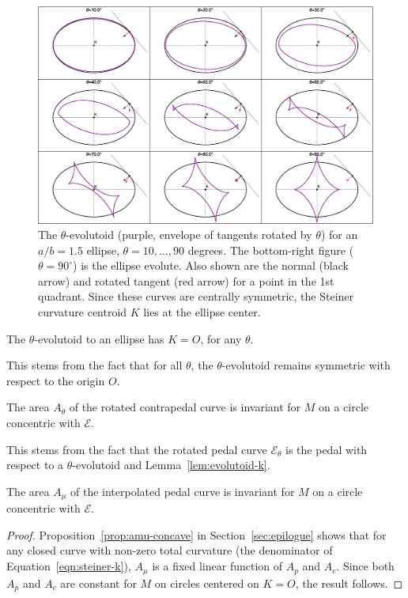 \begin{figure}
    \centering
    \includegraphics[width=\textwidth]{pics/0015_evolutoids.eps}
    \caption{The $\theta$-evolutoid \cite{jesus2015,jesus2014} (purple, envelope of tangents rotated by $\theta$) for an $a/b=1.5$ ellipse, $\theta=10,\ldots,90$ degrees. The bottom-right figure ($\theta=90^\circ$) is the ellipse evolute. Also shown are the normal (black arrow) and rotated tangent (red arrow) for a point in the 1st quadrant. Since these curves are centrally symmetric, the Steiner curvature centroid $K$ lies at the ellipse center.}
    \label{fig:evolutoid}
\end{figure}

\begin{lemma}
The $\theta$-evolutoid to an ellipse has $K=O$, for any $\theta$.  
\label{lem:evolutoid-k}
\end{lemma}

This stems from the fact that for all $\theta$, the $\theta$-evolutoid remains symmetric with respect to the origin $O$.

\begin{corollary}
The area $A_{\theta}$ of the rotated contrapedal curve is invariant for $M$ on a circle concentric with $\mathcal{E}$.
\end{corollary}

This stems from the fact that the rotated pedal curve $\mathcal{E}_{\theta}$ is the pedal with respect to a $\theta$-evolutoid and Lemma~\ref{lem:evolutoid-k}.

\begin{theorem}
The area $A_\mu$ of the interpolated pedal curve is invariant for $M$ on a circle concentric with $\mathcal{E}$.
\end{theorem}

\begin{proof}
Proposition~\ref{prop:amu-concave} in Section~\ref{sec:epilogue} shows that for any closed curve with non-zero total curvature (the denominator of Equation~\eqref{eqn:steiner-k}),  $A_{\mu}$ is a fixed linear function of $A_p$ and $A_c$. Since both $A_p$ and $A_c$ are constant for $M$ on circles centered on $K=O$, the result follows.
\end{proof}
